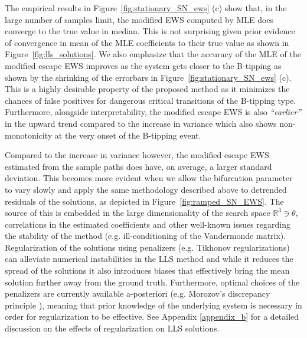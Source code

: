 \documentclass[a4paper,fleqn]{cas-sc}
\newcommand{\fref}[1]{Figure~\ref{#1}}
\begin{document}
The empirical results in \fref{fig:stationary_SN_ews} (c) show that, in the large number of samples limit, the modified EWS computed by MLE does converge to the true value in median.
This is not surprising given prior evidence of convergence in mean of the MLE coefficients to their true value as shown in \fref{fig:lls_solutions}.
We also emphasize that the accuracy of the MLE of the modified escape EWS improves as the system gets closer to the B-tipping as shown by the shrinking of the errorbars in \fref{fig:stationary_SN_ews} (c).
This is a highly desirable property of the proposed method as it minimizes the chances of false positives for dangerous critical transitions of the B-tipping type.
Furthermore, alongside interpretability, the modified escape EWS is also \textit{``earlier''} in the upward trend compared to the increase in variance which also shows non-monotonicity at the very onset of the B-tipping event.

Compared to the increase in variance however, the modified escape EWS estimated from the sample paths does have, on average, a larger standard deviation.
This becomes more evident when we allow the bifurcation parameter to vary slowly and apply the same methodology described above to detrended residuals of the solutions, as depicted in \fref{fig:ramped_SN_EWS}.
The source of this is embedded in the large dimensionality of the search space $\mathbb{R}^{3}\ni\theta$, correlations in the estimated coefficients and other well-known issues regarding the stability of the method (e.g. ill-conditioning of the Vandermonde matrix).
Regularization of the solutions using penalizers (e.g. Tikhonov regularizations) can alleviate numerical instabilities in the LLS method and while it reduces the spread of the solutions it also introduces biases that effectively bring the mean solution further away from the ground truth.
Furthermore, optimal choices of the penalizers are currently available a-posteriori (e.g. Morozov's discrepancy principle \cite{Nair2009}), meaning that prior knowledge of the underlying system is necessary in order for regularization to be effective.
See Appendix \ref{appendix_b} for a detailed discussion on the effects of regularization on LLS solutions.
%
\end{document}
